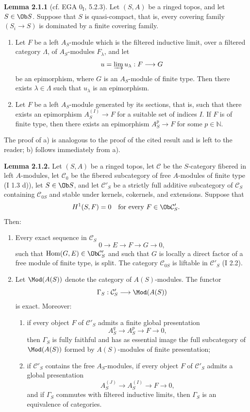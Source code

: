 \documentclass[11pt]{article}
\begin{document}
\textbf{Lemma 2.1.1} (cf. EGA $0_{\mathrm I}$, 5.2.3). Let $(S,A)$ be a ringed topos, and let $S\in\Ob S$. Suppose that $S$ is quasi-compact, that is, every covering family $(S_i\to S)$ is dominated by a finite covering family.
\begin{enumerate}[label=\alph*)]
\item Let $F$ be a left $A_S$-module which is the filtered inductive limit, over a filtered category $\Lambda$, of $A_S$-modules $F_\lambda$, and let
\[
u=\varinjlim u_\lambda:F\longrightarrow G
\]
be an epimorphism, where $G$ is an $A_S$-module of finite type. Then there exists $\lambda\in\Lambda$ such that $u_\lambda$ is an epimorphism.
\item Let $F$ be a left $A_S$-module generated by its sections, that is, such that there exists an epimorphism $A_S^{(I)}\to F$ for a suitable set of indices $I$. If $F$ is of finite type, then there exists an epimorphism $A_S^p\to F$ for some $p\in\mathbb N$.
\end{enumerate}
The proof of a) is analogous to the proof of the cited result and is left to the reader; b) follows immediately from a).

\textbf{Lemma 2.1.2.} Let $(S,A)$ be a ringed topos, let $\mathcal C$ be the $S$-category fibered in left $A$-modules, let $\mathcal C_0$ be the fibered subcategory of free $A$-modules of finite type (I 1.3 d)), let $S\in\Ob S$, and let $\mathcal C'_S$ be a strictly full additive subcategory of $\mathcal C_S$ containing $\mathcal C_{0S}$ and stable under kernels, cokernels, and extensions. Suppose that
\[
H^1(S,F)=0\quad\text{for every }F\in\Ob\mathcal C'_S.
\]
Then:
\begin{enumerate}[label=\alph*)]
\item Every exact sequence in $\mathcal C_S$
\[
0\longrightarrow E\longrightarrow F\longrightarrow G\longrightarrow0,
\]
such that $\operatorname{Hom}(G,E)\in\Ob\mathcal C'_S$ and such that $G$ is locally a direct factor of a free module of finite type, is split. The category $\mathcal C_{0S}$ is liftable in $\mathcal C'_S$ (I 2.2).
\item Let $\Mod(A(S))$ denote the category of $A(S)$-modules. The functor
\[
\Gamma_S:\mathcal C'_S\longrightarrow\Mod(A(S))
\]
is exact. Moreover:
\begin{enumerate}[label=(\roman*)]
\item if every object $F$ of $\mathcal C'_S$ admits a finite global presentation
\[
A_S^q\longrightarrow A_S^p\longrightarrow F\longrightarrow0,
\]
then $\Gamma_S$ is fully faithful and has as essential image the full subcategory of $\Mod(A(S))$ formed by $A(S)$-modules of finite presentation;
\item if $\mathcal C'_S$ contains the free $A_S$-modules, if every object $F$ of $\mathcal C'_S$ admits a global presentation
\[
A_S^{(J)}\longrightarrow A_S^{(I)}\longrightarrow F\longrightarrow0,
\]
and if $\Gamma_S$ commutes with filtered inductive limits, then $\Gamma_S$ is an equivalence of categories.
\end{enumerate}
\end{enumerate}
\end{document}
